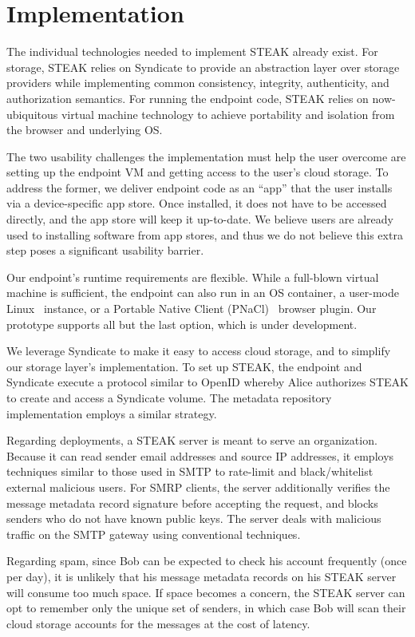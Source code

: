 \section{Implementation}

The individual technologies needed to implement STEAK already exist.  For storage, STEAK relies on Syndicate to provide an abstraction layer over storage providers while implementing common consistency, integrity, authenticity, and authorization semantics.  For running the endpoint code, STEAK relies on now-ubiquitous virtual machine technology to achieve portability and isolation from the browser and underlying OS.

The two usability challenges the implementation must help the user overcome are setting up the endpoint VM and getting access to the user’s cloud storage.  To address the former, we deliver endpoint code as an “app” that the user installs via a device-specific app store.  Once installed, it does not have to be accessed directly, and the app store will keep it up-to-date.  We believe users are already used to installing software from app stores, and thus we do not believe this extra step poses a significant usability barrier.

Our endpoint’s runtime requirements are flexible.  While a full-blown virtual machine is sufficient, the endpoint can also run in an OS container, a user-mode Linux~\cite{usermode-linux} instance, or a Portable Native Client (PNaCl)~\cite{pnacl} browser plugin.  Our prototype supports all but the last option, which is under development.

We leverage Syndicate to make it easy to access cloud storage, and to simplify our storage layer’s implementation.  To set up STEAK, the endpoint and Syndicate execute a protocol similar to OpenID whereby Alice authorizes STEAK to create and access a Syndicate volume.  The metadata repository implementation employs a similar strategy.

Regarding deployments, a STEAK server is meant to serve an organization.  Because it can read sender email addresses and source IP addresses, it employs techniques similar to those used in SMTP to rate-limit and black/whitelist external malicious users.  For SMRP clients, the server additionally verifies the message metadata record signature before accepting the request, and blocks senders who do not have known public keys.  The server deals with malicious traffic on the SMTP gateway using conventional techniques.

Regarding spam, since Bob can be expected to check his account frequently (once per day), it is unlikely that his message metadata records on his STEAK server will consume too much space.  If space becomes a concern, the STEAK server can opt to remember only the unique set of senders, in which case Bob will scan their cloud storage accounts for the messages at the cost of latency.

